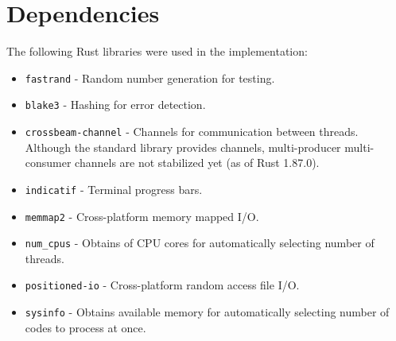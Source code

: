 \begin{tiny}

\end{tiny}

\clearpage

\section{Dependencies}

\label{appendix:dependencies}

The following Rust libraries were used in the implementation:

\begin{itemize}
    \item \texttt{fastrand} - Random number generation for testing.
    \item \texttt{blake3} - Hashing for error detection.
    \item \texttt{crossbeam-channel} - Channels for communication between threads. Although the standard library provides channels, multi-producer multi-consumer channels are not stabilized yet (as of Rust 1.87.0).
    \item \texttt{indicatif} - Terminal progress bars.
    \item \texttt{memmap2} - Cross-platform memory mapped I/O.
    \item \texttt{num\_cpus} - Obtains of CPU cores for automatically selecting number of threads.
    \item \texttt{positioned-io} - Cross-platform random access file I/O.
    \item \texttt{sysinfo} - Obtains available memory for automatically selecting number of codes to process at once.
\end{itemize}
